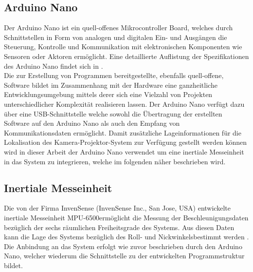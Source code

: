 \subsection{Arduino Nano}
\label{chap.arduino}
Der Arduino Nano ist ein quell-offenes Mikrocontroller Board, welches durch Schnittstellen in Form von analogen und digitalen Ein- und Ausgängen die Steuerung, Kontrolle und Kommunikation mit elektronischen Komponenten wie Sensoren oder Aktoren ermöglicht. Eine detaillierte Auflistung der Spezifikationen des Arduino Nano findet sich in .\\
Die zur Erstellung von Programmen bereitgestellte, ebenfalls quell-offene, Software bildet im Zusammenhang mit der Hardware eine ganzheitliche Entwicklungsumgebung mittels derer sich eine Vielzahl von Projekten unterschiedlicher Komplexität realisieren lassen. Der Arduino Nano verfügt dazu über eine USB-Schnittstelle welche sowohl die Übertragung der erstellten Software auf den Arduino Nano als auch den Empfang von Kommunikationsdaten ermöglicht. Damit zusätzliche Lageinformationen für die Lokalisation des Kamera-Projektor-System zur Verfügung gestellt werden können wird in dieser Arbeit der Arduino Nano verwendet um eine inertiale Messeinheit in das System zu integrieren, welche im folgenden näher beschrieben wird.
\\


\subsection{Inertiale Messeinheit}
\label{chap.imu}
Die von der Firma InvenSense (InvenSense Inc., San Jose, USA) entwickelte inertiale Messeinheit MPU-6500\texttrademark \space ermöglicht die Messung der Beschleunigungsdaten bezüglich der sechs räumlichen Freiheitsgrade des Systems. Aus diesen Daten kann die Lage des Systems bezüglich des Roll- und Nickwinkels\red[footnote] bestimmt werden \cite{IMU}. Die Anbindung an das System erfolgt wie zuvor beschrieben durch den Arduino Nano, welcher wiederum die Schnittstelle zu der entwickelten Programmstruktur bildet.


